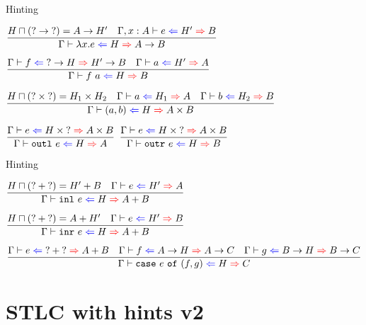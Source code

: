 \documentclass{beamer}
\newcommand{\Fun}[2]{#1 \to #2}
\newcommand{\Prod}[2]{#1 \times #2}
\newcommand{\Sum}[2]{#1 + #2}
\newcommand{\fun}[2]{\lambda #1. #2}
\newcommand{\app}[2]{#1\ #2}
\newcommand{\pair}[2]{(#1, #2)}
\newcommand{\outl}[1][]{\texttt{outl}\ #1}
\newcommand{\outr}[1][]{\texttt{outr}\ #1}
\newcommand{\inl}[1][]{\texttt{inl}\ #1}
\newcommand{\inr}[1][]{\texttt{inr}\ #1}
\newcommand{\case}[3]{\texttt{case}\ #1\ \texttt{of}\ (#2, #3)}
\newcommand{\infrule}[3][]{\displaystyle \frac{#2}{#3} \textsc{\footnotesize{#1}}}
\newcommand{\extend}[3]{#1, #2 : #3}
\newcommand{\sidecond}[1]{#1}
\begin{document}
\begin{frame}{Hinting}

\begin{center}
  $\infrule{\sidecond{\combinehints{H}{(\Fun{\Hint}{\Hint})} = \Fun{A}{H'}} \quad \fullhinting{\extend{\Gamma}{x}{A}}{e}{H'}{B}}{\hinting{\fun{x}{e}}{H}{\Fun{A}{B}}}$

  \vspace{1em}

  $\infrule{\hinting{f}{\Fun{\Hint}{H}}{\Fun{H'}{B}} \quad \hinting{a}{H'}{A}}{\hinting{\app{f}{a}}{H}{B}}$

  \vspace{1em}

  $\infrule{\sidecond{\combinehints{H}{(\Prod{\Hint}{\Hint})} = \Prod{H_1}{H_2}} \quad \hinting{a}{H_1}{A} \quad \hinting{b}{H_2}{B}}{\hinting{\pair{a}{b}}{H}{\Prod{A}{B}}}$

  \vspace{1em}

  $\infrule{\hinting{e}{\Prod{H}{\Hint}}{\Prod{A}{B}}}{\hinting{\outl[e]}{H}{A}}$ \quad
  $\infrule{\hinting{e}{\Prod{H}{\Hint}}{\Prod{A}{B}}}{\hinting{\outr[e]}{H}{B}}$
\end{center}

\end{frame}

\begin{frame}{Hinting}

\begin{center}
  $\infrule{\sidecond{\combinehints{H}{(\Sum{\Hint}{\Hint})} = \Sum{H'}{B}} \quad \hinting{e}{H'}{A}}{\hinting{\inl[e]}{H}{\Sum{A}{B}}}$

  \vspace{2em}

  $\infrule{\sidecond{\combinehints{H}{(\Sum{\Hint}{\Hint})} = \Sum{A}{H'}} \quad \hinting{e}{H'}{B}}{\hinting{\inr[e]}{H}{\Sum{A}{B}}}$

  \vspace{2em}

  $\infrule{\hinting{e}{\Sum{\Hint}{\Hint}}{\Sum{A}{B}} \quad \hinting{f}{\Fun{A}{H}}{\Fun{A}{C}} \quad \hinting{g}{\Fun{B}{H}}{\Fun{B}{C}}}{\hinting{\case{e}{f}{g}}{H}{C}}$
\end{center}

\end{frame}

\section{STLC with hints v2}
\end{document}
